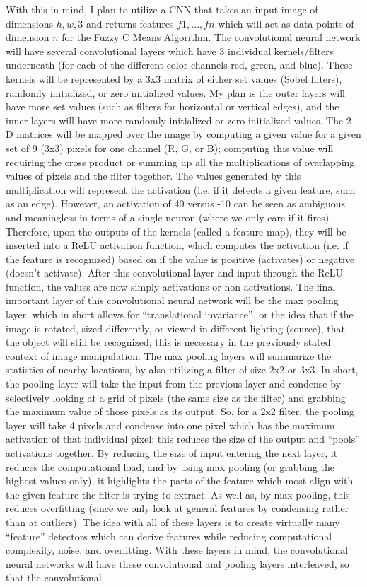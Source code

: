 \documentclass[10pt,twocolumn]{article}
\begin{document}
With this in mind, I plan to utilize a CNN that takes an input image of dimensions \(h, w, 3 \) and returns features \( {f1, …, fn} \) which will act as data points of dimension \(n \) for the Fuzzy C Means Algorithm. The convolutional neural network will have several convolutional layers which have 3 individual kernels/filters underneath (for each of the different color channels red, green, and blue). These kernels will be represented by a 3x3 matrix of either set values (Sobel filters), randomly initialized, or zero initialized values. My plan is the outer layers will have more set values (such as filters for horizontal or vertical edges), and the inner layers will have more randomly initialized or zero initialized values. The 2-D matrices will be mapped over the image by computing a given value for a given set of 9 (3x3) pixels for one channel (R, G, or B); computing this value will requiring the cross product or summing up all the multiplications of overlapping values of pixels and the filter together. The values generated by this multiplication will represent the activation (i.e. if it detects a given feature, such as an edge). However, an activation of 40 versus -10 can be seen as ambiguous and meaningless in terms of a single neuron (where we only care if it fires). Therefore, upon the outputs of the kernels (called a feature map), they will be inserted into a ReLU activation function, which computes the activation (i.e. if the feature is recognized) based on if the value is positive (activates) or negative (doesn’t activate). After this convolutional layer and input through the ReLU function, the values are now simply activations or non activations. The final important layer of this convolutional neural network will be the max pooling layer, which in short allows for “translational invariance”, or the idea that if the image is rotated, sized differently, or viewed in different lighting (source), that the object will still be recognized; this is necessary in the previously stated context of image manipulation. The max pooling layers will summarize the statistics of nearby locations, by also utilizing a filter of size 2x2 or 3x3. In short, the pooling layer will take the input from the previous layer and condense by selectively looking at a grid of pixels (the same size as the filter) and grabbing the maximum value of those pixels as its output. So, for a 2x2 filter, the pooling layer will take 4 pixels and condense into one pixel which has the maximum activation of that individual pixel; this reduces the size of the output and “pools” activations together. By reducing the size of input entering the next layer, it reduces the computational load, and by using max pooling (or grabbing the highest values only), it highlights the parts of the feature which most align with the given feature the filter is trying to extract. As well as, by max pooling, this reduces overfitting (since we only look at general features by condensing rather than at outliers). The idea with all of these layers is to create virtually many “feature” detectors which can derive features while reducing computational complexity, noise, and overfitting. With these layers in mind, the convolutional neural networks will have these convolutional and pooling layers interleaved, so that the convolutional 
\end{document}
